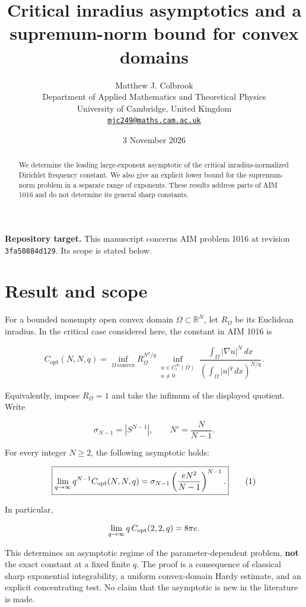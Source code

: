 \documentclass[11pt,a4paper]{article}
\title{\textbf{Critical inradius asymptotics and a supremum-norm bound for convex domains}}
\author{Matthew J. Colbrook\\[3pt]
{\small Department of Applied Mathematics and Theoretical Physics}\\
{\small University of Cambridge, United Kingdom}\\
{\small\href{mailto:mjc249@maths.cam.ac.uk}{\texttt{mjc249@maths.cam.ac.uk}}}}
\date{3 November 2026}
\begin{document}
\maketitle
\begin{abstract}
We determine the leading large-exponent asymptotic of the critical inradius-normalized Dirichlet frequency constant. We also give an explicit lower bound for the supremum-norm problem in a separate range of exponents. These results address parts of AIM 1016 and do not determine its general sharp constants.
\end{abstract}
\noindent\textbf{Repository target.}
This manuscript concerns AIM problem 1016 at revision
\texttt{3fa50884d129}. Its scope is stated below.
\medskip

\hypertarget{1016-result-and-scope}{%
\section{Result and scope}\label{1016-result-and-scope}}

For a bounded nonempty open convex domain \(\Omega\subset\mathbb R^N\),
let \(R_\Omega\) be its Euclidean inradius. In the critical case
considered here, the constant in AIM 1016 is

\[
C_{\mathrm{opt}}(N,N,q)=
\inf_{\Omega\ \mathrm{convex}} R_\Omega^{N^2/q}
\inf_{\substack{u\in C_c^\infty(\Omega)\\u\ne0}}
\frac{\int_\Omega|\nabla u|^N\,dx}
 {(\int_\Omega|u|^q\,dx)^{N/q}}.
\]

Equivalently, impose \(R_\Omega=1\) and take the infimum of the
displayed quotient. Write

\[
\sigma_{N-1}=|S^{N-1}|,\qquad N'=\frac{N}{N-1}.
\]

For every integer \(N\ge 2\), the following asymptotic holds:

\[
\boxed{\displaystyle
\lim_{q\to\infty}q^{N-1}C_{\rm opt}(N,N,q)
=\sigma_{N-1}\left(\frac{eN^2}{N-1}\right)^{N-1}.}
\tag{1}
\]

In particular,

\[
\lim_{q\to\infty}q\,C_{\rm opt}(2,2,q)=8\pi e.
\]

This determines an asymptotic regime of the parameter-dependent problem,
\textbf{not} the exact constant at a fixed finite \(q\). The proof is a
consequence of classical sharp exponential integrability, a uniform
convex-domain Hardy estimate, and an explicit concentrating test. No
claim that the asymptotic is new in the literature is made.
\end{document}
